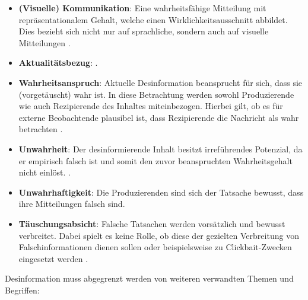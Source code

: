 \documentclass[12pt,a4paper]{article}        %
\begin{document}
\begin{itemize}
  \item \textbf{(Visuelle) Kommunikation}: Eine wahrheitsfähige Mitteilung mit repräsentationalem Gehalt, welche einen Wirklichkeitsausschnitt abbildet. Dies bezieht sich nicht nur auf sprachliche, sondern auch auf visuelle Mitteilungen \parencite[151]{marx_fake_2020}.
  \item \textbf{Aktualitätsbezug}:  \parencite[152]{marx_fake_2020}.
  \item \textbf{Wahrheitsanspruch}: Aktuelle Desinformation beansprucht für sich, dass sie (vorgetäuscht) wahr ist. In diese Betrachtung werden sowohl Produzierende wie auch Rezipierende des Inhaltes miteinbezogen. Hierbei gilt, ob es für externe Beobachtende plausibel ist, dass Rezipierende die Nachricht als wahr betrachten \parencite[153]{marx_fake_2020}.
  \item \textbf{Unwahrheit}: Der desinformierende Inhalt besitzt irreführendes Potenzial, da er empirisch falsch ist und somit den zuvor beanspruchten Wahrheitsgehalt nicht einlöst. \parencite[154]{marx_fake_2020}.
  \item \textbf{Unwahrhaftigkeit}: Die Produzierenden sind sich der Tatsache bewusst, dass ihre Mitteilungen falsch sind. \parencite[156]{marx_fake_2020}
  \item \textbf{Täuschungsabsicht}: Falsche Tatsachen werden vorsätzlich und bewusst verbreitet. Dabei spielt es keine Rolle, ob diese der gezielten Verbreitung von Falschinformationen dienen sollen oder beispielsweise zu Clickbait-Zwecken eingesetzt werden \parencites[157]{marx_fake_2020}[vgl.\ auch][2]{khan_fake_2021}. 
\end{itemize}

Desinformation muss abgegrenzt werden von weiteren verwandten Themen und Begriffen:
\end{document}
